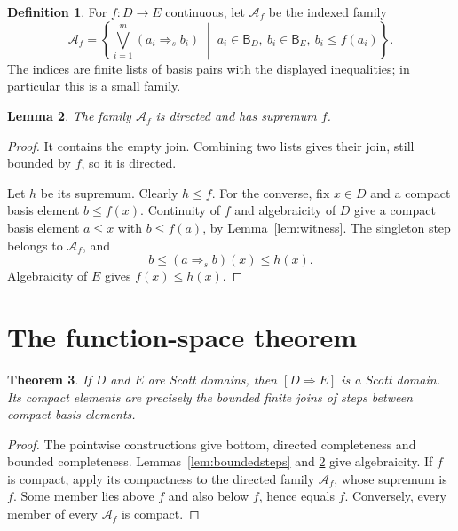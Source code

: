\documentclass[11pt,a4paper]{article}
\newtheorem{theorem}{Theorem}[section]
\newtheorem{lemma}[theorem]{Lemma}
\theoremstyle{definition}
\newtheorem{definition}[theorem]{Definition}
\theoremstyle{remark}
\newcommand{\B}{\mathsf B}
\newcommand{\step}[2]{(#1\mathbin{\Rightarrow}_{\!s}#2)}
\begin{document}
\begin{definition}
For $f:D\to E$ continuous, let $\mathcal A_f$ be the indexed family
\[
 \mathcal A_f=
 \left\{
   \bigvee_{i=1}^{m}\step{a_i}{b_i}
   \;\middle|\;
   a_i\in\B_D,\ b_i\in\B_E,\ b_i\leq f(a_i)
 \right\}.
\]
The indices are finite lists of basis pairs with the displayed
inequalities; in particular this is a small family.
\end{definition}

\begin{lemma}\label{lem:stepdensity}
The family $\mathcal A_f$ is directed and has supremum $f$.
\end{lemma}
\begin{proof}
It contains the empty join. Combining two lists gives their join,
still bounded by $f$, so it is directed.

Let $h$ be its supremum. Clearly $h\leq f$. For the converse, fix $x\in D$
and a compact basis element $b\leq f(x)$. Continuity of $f$ and
algebraicity of $D$ give a compact basis element $a\leq x$ with
$b\leq f(a)$, by Lemma~\ref{lem:witness}. The singleton step belongs to
$\mathcal A_f$, and
\[
 b\leq\step a b(x)\leq h(x).
\]
Algebraicity of $E$ gives $f(x)\leq h(x)$.
\end{proof}

\section{The function-space theorem}

\begin{theorem}\label{thm:exponential}
If $D$ and $E$ are Scott domains, then $[D\Rightarrow E]$ is a Scott
domain. Its compact elements are precisely the bounded finite joins of
steps between compact basis elements.
\end{theorem}
\begin{proof}
The pointwise constructions give bottom, directed completeness and
bounded completeness. Lemmas~\ref{lem:boundedsteps} and
\ref{lem:stepdensity} give algebraicity. If $f$ is compact, apply its
compactness to the directed family $\mathcal A_f$, whose supremum is
$f$. Some member lies above $f$ and also below $f$, hence equals $f$.
Conversely, every member of every $\mathcal A_f$ is compact.
\end{proof}
\end{document}
